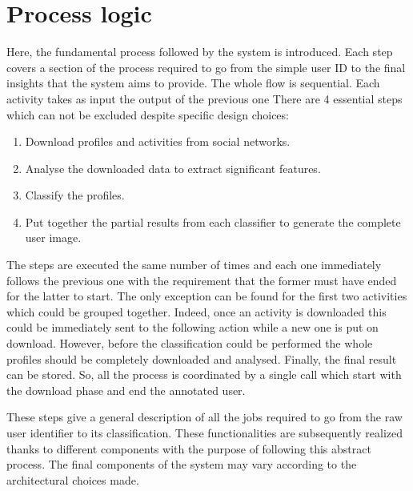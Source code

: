 \section{Process logic}
Here, the fundamental process followed by the system is introduced.
Each step covers a section of the process required to go from the simple user ID to the final insights that the system aims to provide.
The whole flow is sequential. Each activity takes as input the output of the previous one
There are 4 essential steps which can not be excluded despite specific design choices:
\begin{enumerate}
    \item Download profiles and activities from social networks.
    \item Analyse the downloaded data to extract significant features.
    \item Classify the profiles.
    \item Put together the partial results from each classifier to generate the complete user image.
\end{enumerate}
The steps are executed the same number of times and each one immediately follows the previous one with the requirement that the former must have ended for the latter to start.
The only exception can be found for the first two activities which could be grouped together. Indeed, once an activity is downloaded this could be immediately sent to the following action while a new one is put on download.
However, before the classification could be performed the whole profiles should be completely downloaded and analysed.
Finally, the final result can be stored. So, all the process is coordinated by a single call which start with the download phase and end the annotated user.

These steps give a general description of all the jobs required to go from the raw user identifier to its classification.
These functionalities are subsequently realized thanks to different components with the purpose of following this abstract process.
The final components of the system may vary according to the architectural choices made.

